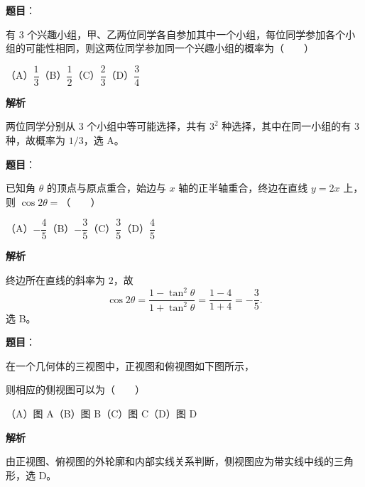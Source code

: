 \begin{answer}

\textbf{题目}：

有 $3$ 个兴趣小组，甲、乙两位同学各自参加其中一个小组，每位同学参加各个小组的可能性相同，则这两位同学参加同一个兴趣小组的概率为\mbox{（　　）}

（A）$\dfrac13$\quad（B）$\dfrac12$\quad（C）$\dfrac23$\quad（D）$\dfrac34$

\textbf{解析}

两位同学分别从 3 个小组中等可能选择，共有 $3^2$ 种选择，其中在同一小组的有 $3$ 种，故概率为 $1/3$，选 A。


\end{answer}
\begin{answer}

\textbf{题目}：

已知角 $\theta$ 的顶点与原点重合，始边与 $x$ 轴的正半轴重合，终边在直线 $y=2x$ 上，则 $\cos2\theta=$\mbox{（　　）}

（A）$-\dfrac45$\quad（B）$-\dfrac35$\quad（C）$\dfrac35$\quad（D）$\dfrac45$

\textbf{解析}

终边所在直线的斜率为 $2$，故
\nopagebreak[4]
\[
\cos2\theta=\frac{1-\tan^2\theta}{1+\tan^2\theta}=\frac{1-4}{1+4}=-\frac35.
\]
选 B。


\end{answer}
\begin{answer}

\textbf{题目}：

在一个几何体的三视图中，正视图和俯视图如下图所示，

则相应的侧视图可以为\mbox{（　　）}
\nopagebreak[4]
\begin{center}\end{center}
\nopagebreak[4]
（A）图 A\quad（B）图 B\quad（C）图 C\quad（D）图 D

\textbf{解析}

由正视图、俯视图的外轮廓和内部实线关系判断，侧视图应为带实线中线的三角形，选 D。


\end{answer}
